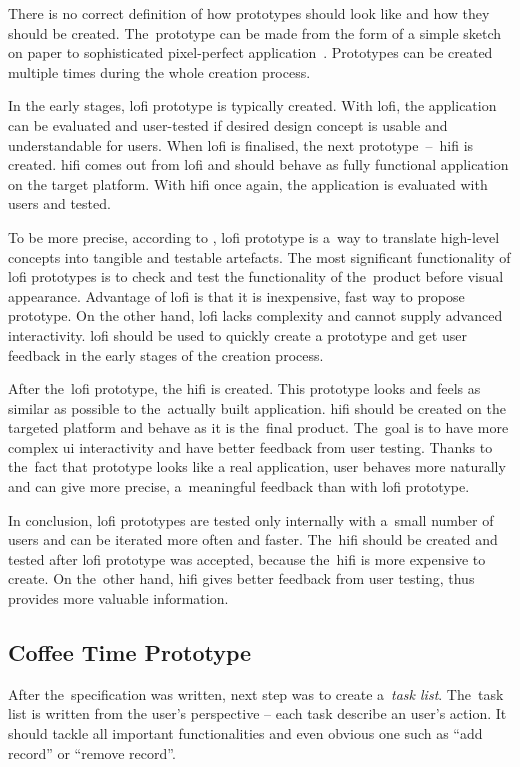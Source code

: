 There is no correct definition of how prototypes should look like and how they should be created. The~prototype can be made from the form of a simple sketch on paper to sophisticated pixel-perfect application~\cite{adobe-prototype}. Prototypes can be created multiple times during the whole creation process. 

In the early stages, \gls{lofi} prototype is typically created. With \gls{lofi}, the application can be evaluated and user-tested if desired design concept is usable and understandable for users. When \gls{lofi} is finalised, the next prototype~--~\gls{hifi} is created. \gls{hifi} comes out from \gls{lofi} and should behave as fully functional application on the target platform. With \gls{hifi} once again, the application is evaluated with users and tested. 

To be more precise, according to \cite{adobe-prototype}, \gls{lofi} prototype is a~way to translate high-level concepts into tangible and testable artefacts. The most significant  functionality of \gls{lofi} prototypes is to check and test the functionality of the~product before visual appearance. Advantage of \gls{lofi} is that it is inexpensive, fast way to propose prototype. On the other hand, \gls{lofi} lacks complexity and cannot supply advanced interactivity. \gls{lofi} should be used to quickly create a prototype and get user feedback in the early stages of the creation process. 

After the~\gls{lofi} prototype, the \gls{hifi} is created. This prototype looks and feels as similar as possible to the~actually built application. \gls{hifi} should be created on the targeted platform and behave as it is the~final product. The~goal is to have more complex \gls{ui} interactivity and have better feedback from user testing. Thanks to the~fact that prototype looks like a real application, user behaves more naturally and can give more precise, a~meaningful feedback than with \gls{lofi} prototype. 

In conclusion, \gls{lofi} prototypes are tested only internally with a~small number of users and can be iterated more often and faster. The~\gls{hifi} should be created and tested after \gls{lofi} prototype was accepted, because the~\gls{hifi} is more expensive to create. On the~other hand, \gls{hifi} gives better feedback from user testing, thus provides more valuable information.
\subsection{Coffee Time Prototype}
After the~specification was written, next step was to create a~\textit{task list}. The~task list is written from the user's perspective -- each task describe an user's action. It should tackle all important functionalities and even obvious one such as ``add record'' or ``remove record''.


